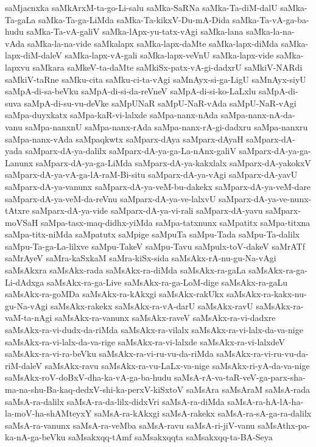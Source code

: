 {saMjacnxka
saMkArxM-ta-go-Li-salu
saMka-SaRNa
saMka-Ta-diM-dalU
saMka-Ta-gaLa
saMka-Ta-ga-LiMda
saMka-Ta-kikxV-Du-mA-Dida
saMka-Ta-vA-ga-ba-hudu
saMka-Ta-vA-galiV
saMka-lApx-yu-tatx-vAgi
saMka-lana
saMka-la-na-vAda
saMka-la-na-vide
saMkalapx
saMka-lapx-daMte
saMka-lapx-diMda
saMka-lapx-diM-daleV
saMka-lapx-vA-gali
saMka-lapx-veVnU
saMka-lapx-vide
saMka-lapxvu
saMkara
saMkeV-ta-daMte
saMkiSx-patx-vA-gi-dadxrU
saMkiV-NARdi
saMkiV-taRne
saMku-cita
saMku-ci-ta-vAgi
saMnAyx-si-ga-LigU
saMnAyx-siyU
saMpA-di-sa-beVku
saMpA-di-si-da-reVneV
saMpA-di-si-ko-LaLxlu
saMpA-di-suva
saMpA-di-su-vu-deVke
saMpUNaR
saMpU-NaR-vAda
saMpU-NaR-vAgi
saMpa-duyxkatx
saMpa-kaR-vi-lalxde
saMpa-nanx-nAda
saMpa-nanx-nA-da-vanu
saMpa-nanxnU
saMpa-nanx-rAda
saMpa-nanx-rA-gi-dadxru
saMpa-nanxru
saMpa-nanx-vAda
saMpaqkwtx
saMparx-dAya
saMparx-dAyaH
saMparx-dA-yada
saMparx-dA-ya-dalilx
saMparx-dA-ya-ga-La-nAnx-galiV
saMparx-dA-ya-ga-Lanunx
saMparx-dA-ya-ga-LiMda
saMparx-dA-ya-kakxlalx
saMparx-dA-yakokxV
saMparx-dA-ya-vA-ga-lA-raM-Bi-situ
saMparx-dA-ya-vAgi
saMparx-dA-yavU
saMparx-dA-ya-vanunx
saMparx-dA-ya-veM-bu-dakekx
saMparx-dA-ya-veM-dare
saMparx-dA-ya-veM-da-reVnu
saMparx-dA-ya-ve-lalxvU
saMparx-dA-ya-ve-nunx-tAtxre
saMparx-dA-ya-vide
saMparx-dA-ya-vi-rali
saMparx-dA-yavu
saMparx-moVSaH
saMpa-tasx-maq-didhx-yiMda
saMpa-tatxnunx
saMpatitx
saMpa-titxna
saMpa-titx-niMda
saMpatutx
saMpige
saMpuTa
saMpu-Tada
saMpu-Ta-dalilx
saMpu-Ta-ga-La-lilxve
saMpu-TakeV
saMpu-Tavu
saMpulx-toV-dakeV
saMrATf
saMrAyeV
saMra-kaSxkaM
saMra-kiSx-sida
saMsAkx-rA-nu-gu-Na-vAgi
saMsAkxra
saMsAkx-rada
saMsAkx-ra-diMda
saMsAkx-ra-gaLa
saMsAkx-ra-ga-Li-dAdxga
saMsAkx-ra-ga-Live
saMsAkx-ra-ga-LoM-dige
saMsAkx-ra-gaLu
saMsAkx-ra-goMDa
saMsAkx-ra-kAkxgi
saMsAkx-rakUkx
saMsAkx-ra-kakx-nu-gu-Na-vAgi
saMsAkx-rakekx
saMsAkx-ra-vA-darU
saMsAkx-ravU
saMsAkx-ra-vaM-ta-nAgi
saMsAkx-ra-vanunx
saMsAkx-raveV
saMsAkx-ra-vi-dadxre
saMsAkx-ra-vi-dudx-da-riMda
saMsAkx-ra-vilalx
saMsAkx-ra-vi-lalx-da-va-nige
saMsAkx-ra-vi-lalx-da-va-rige
saMsAkx-ra-vi-lalxde
saMsAkx-ra-vi-lalxdeV
saMsAkx-ra-vi-ra-beVku
saMsAkx-ra-vi-ru-vu-da-riMda
saMsAkx-ra-vi-ru-vu-da-riM-daleV
saMsAkx-ravu
saMsAkx-ra-vu-LaLx-va-nige
saMsAkx-ri-yA-da-va-nige
saMsAkx-roV-doBxV-dha-ka-vA-ga-ba-hudu
saMsA-rA-va-taR-veV-ga-parx-sha-ma-na-shu-Ba-kaq-dedxV-shi-ka-perxV-kiSxtoV
saMsAra
saMsAraM
saMsA-rada
saMsA-ra-dalilx
saMsA-ra-da-lilx-didxVri
saMsA-ra-diMda
saMsA-ra-hA-lA-ha-la-moV-ha-shAMteyxY
saMsA-ra-kAkxgi
saMsA-rakekx
saMsA-ra-sA-ga-ra-dalilx
saMsA-ra-vanunx
saMsA-ra-veMba
saMsA-ravu
saMsA-ri-jiV-vanu
saMsAthx-pa-ka-nA-ga-beVku
saMsakxqq-tAmf
saMsakxqqta
saMsakxqq-ta-BA-Seya
}
